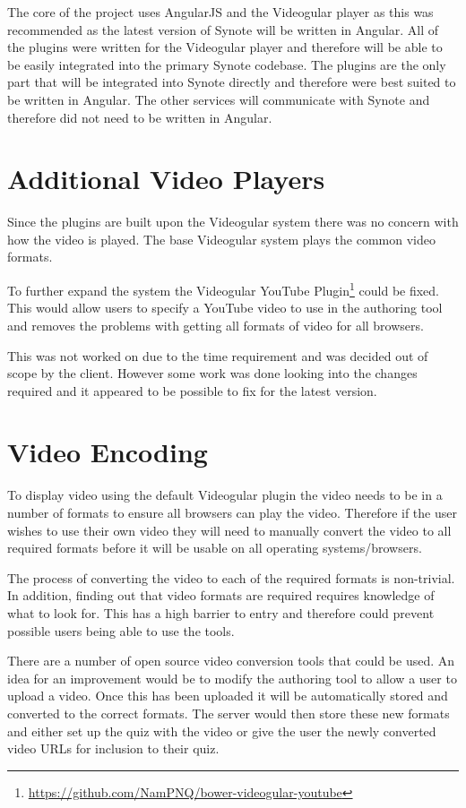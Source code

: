 The core of the project uses \gls{AngularJS} and the \gls{Videogular} player as this was recommended as the latest version of Synote will be written in Angular. All of the plugins were written for the \gls{Videogular} player and therefore will be able to be easily integrated into the primary Synote codebase. The plugins are the only part that will be integrated into Synote directly and therefore were best suited to be written in Angular. The other services will communicate with Synote and therefore did not need to be written in Angular.

\section{Additional Video Players}

Since the plugins are built upon the \gls{Videogular} system there was no concern with how the video is played. The base \gls{Videogular} system plays the common video formats.

To further expand the system the \gls{Videogular} YouTube Plugin\footnote{\url{https://github.com/NamPNQ/bower-videogular-youtube}} could be fixed. This would allow users to specify a YouTube video to use in the authoring tool and removes the problems with getting all formats of video for all browsers.

This was not worked on due to the time requirement and was decided out of scope by the client. However some work was done looking into the changes required and it appeared to be possible to fix for the latest version.

\section{Video Encoding}

To display video using the default \gls{Videogular} plugin the video needs to be in a number of formats to ensure all browsers can play the video. Therefore if the user wishes to use their own video they will need to manually convert the video to all required formats before it will be usable on all operating systems/browsers.

The process of converting the video to each of the required formats is non-trivial. In addition, finding out that video formats are required requires knowledge of what to look for. This has a high barrier to entry and therefore could prevent possible users being able to use the tools.

There are a number of open source video conversion tools that could be used. An idea for an improvement would be to modify the authoring tool to allow a user to upload a video. Once this has been uploaded it will be automatically stored and converted to the correct formats. The server would then store these new formats and either set up the quiz with the video or give the user the newly converted video URLs for inclusion to their quiz.

